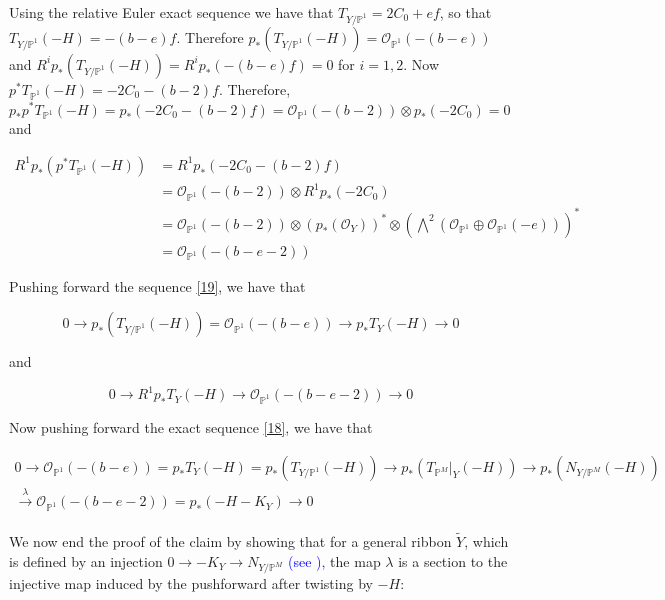 \documentclass[11pt,twoside]{amsart}
\theoremstyle{plain}
\numberwithin{equation}{section}
\theoremstyle{definition}
\begin{document}
Using the relative Euler exact sequence we have that 
$T_{Y/\mathbb{P}^1} = 2C_0+ef$, so that $T_{Y/\mathbb{P}^1}(-H) = -(b-e)f$. Therefore $p_*(T_{Y/\mathbb{P}^1}(-H)) = \mathcal{O}_{\mathbb{P}^1}(-(b-e))$ and $R^ip_*(T_{Y/\mathbb{P}^1}(-H)) = R^ip_*(-(b-e)f) = 0$ for $i = 1,2$. Now $p^*T_{\mathbb{P}^1}(-H) = -2C_0-(b-2)f$. Therefore, $p_*p^*T_{\mathbb{P}^1}(-H) = p_*(-2C_0-(b-2)f) = \mathcal{O}_{\mathbb{P}^1}(-(b-2)) \otimes p_*(-2C_0) = 0$ and

\begin{align*}\label{20}
  R^1p_*(p^*T_{\mathbb{P}^1}(-H)) & = R^1p_*(-2C_0-(b-2)f) \\
  & = \mathcal{O}_{\mathbb{P}^1}(-(b-2)) \otimes R^1p_*(-2C_0) \\
  & = \mathcal{O}_{\mathbb{P}^1}(-(b-2)) \otimes (p_*(\mathcal{O}_Y))^* \otimes (\bigwedge^2(\mathcal{O}_{\mathbb{P}^1} \oplus \mathcal{O}_{\mathbb{P}^1}(-e)))^* \\ 
  & = \mathcal{O}_{\mathbb{P}^1}(-(b-e-2))
\end{align*}

Pushing forward the sequence \ref{19}, we have that 

\begin{equation}\label{21}
0 \to p_*(T_{Y/\mathbb{P}^1}(-H)) = \mathcal{O}_{\mathbb{P}^1}(-(b-e)) \to p_*T_Y(-H) \to 0    
\end{equation}

and 

\begin{equation}\label{22}
   0 \to R^1p_*T_Y(-H) \to \mathcal{O}_{\mathbb{P}^1}(-(b-e-2)) \to 0 
\end{equation}

Now pushing forward the exact sequence \ref{18}, we have that 

\begin{multline}\label{23}
0 \to \mathcal{O}_{\mathbb{P}^1}(-(b-e)) = p_*T_Y(-H) = p_*(T_{Y/\mathbb{P}^1}(-H)) \to p_*(T_{\mathbb{P}^M}|_Y(-H)) \to p_*(N_{Y/\mathbb{P}^M}(-H)) \\ \xrightarrow[]{\lambda} \mathcal{O}_{\mathbb{P}^1}(-(b-e-2)) = p_*(-H-K_Y) \to 0
\end{multline}

We now end the proof of the claim by showing that for a general ribbon $\widetilde{Y}$, which is defined by an injection $0 \to -K_Y \to N_{Y/\mathbb{P}^M}$ \textcolor{blue}{(see \cite[Theorem $1.1$]{BMR21}),} the map $\lambda$ is a section to the injective map induced by the pushforward after twisting by $-H$: 
\end{document}
